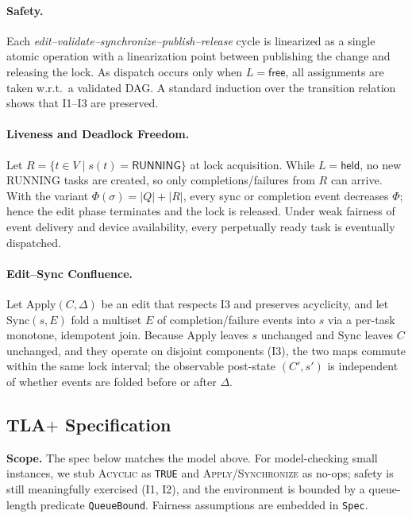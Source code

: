 \documentclass[10pt]{article} %
\begin{document}
\paragraph{Safety.}
Each \emph{edit--validate--synchronize--publish--release} cycle is linearized as a single atomic operation with a linearization point between publishing the change and releasing the lock. As \textsf{dispatch} occurs only when $L=\textsf{free}$, all assignments are taken w.r.t.\ a validated DAG. A standard induction over the transition relation shows that I1--I3 are preserved.

\paragraph{Liveness and Deadlock Freedom.}
Let $R=\{t\in V\mid s(t)=\textsf{RUNNING}\}$ at lock acquisition. While $L=\textsf{held}$, no new \textsf{RUNNING} tasks are created, so only completions/failures from $R$ can arrive. With the variant $\Phi(\sigma)=|Q|+|R|$, every \textsf{sync} or completion event decreases $\Phi$; hence the edit phase terminates and the lock is released. Under weak fairness of event delivery and device availability, every perpetually ready task is eventually dispatched.

\paragraph{Edit--Sync Confluence.}
Let $\mathrm{Apply}(C,\Delta)$ be an edit that respects I3 and preserves acyclicity, and let $\mathrm{Sync}(s,E)$ fold a multiset $E$ of completion/failure events into $s$ via a per-task monotone, idempotent join. Because $\mathrm{Apply}$ leaves $s$ unchanged and $\mathrm{Sync}$ leaves $C$ unchanged, and they operate on disjoint components (I3), the two maps commute within the same lock interval; the observable post-state $(C',s')$ is independent of whether events are folded before or after $\Delta$.

\subsection{TLA\texorpdfstring{$+$}{+} Specification}
\label{app:tla}

\noindent\textbf{Scope.} The spec below matches the model above. For model-checking small instances, we stub \textsc{Acyclic} as \texttt{TRUE} and \textsc{Apply}/\textsc{Synchronize} as no-ops; safety is still meaningfully exercised (I1, I2), and the environment is bounded by a queue-length predicate \texttt{QueueBound}. Fairness assumptions are embedded in \texttt{Spec}.
\end{document}
